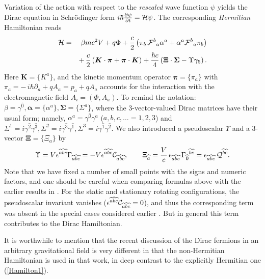 \documentclass[preprint,showpacs,preprintnumbers,eqsecnum,amsmath,amssymb]{revtex4-1}
\begin{document}
Variation of the action with respect to the
{\it rescaled} wave function $\psi$ yields the Dirac equation in Schr\"odinger
form $i\hbar\frac{\partial \psi} {\partial t}= {\cal H}\psi$. The
corresponding {\it Hermitian} Hamiltonian reads
\begin{eqnarray}
{\cal H} &=& \beta mc^2V + q\Phi + {\frac c 2}\left(\pi_b\,{\cal F}^b{}_a
\alpha^a + \alpha^a{\cal F}^b{}_a\pi_b\right)\nonumber\\
\label{Hamilton1} && +\,{\frac c2}\left(\bm{K}\cdot\bm{\pi} +
\bm{\pi}\cdot\bm{K}\right) + {\frac {\hbar c}4}\left(\bm{\Xi}\cdot\bm{\Sigma}
- \Upsilon\gamma_5 \right).
\end{eqnarray}
Here ${\bm K} = \{K^a\}$, and the kinetic momentum operator ${\bm\pi} = \{\pi_a\}$
with $\pi_a = -\,i\hbar\partial_a + qA_a = p_a + qA_a$ accounts for the interaction
with the electromagnetic field $A_i = (\Phi, A_a)$. To remind the notation: $\beta
= \gamma^{\hat 0}, {\bm\alpha} = \{\alpha^a\}, {\bm\Sigma} = \{\Sigma^a\}$, where the
3-vector-valued Dirac matrices have their usual form; namely, $\alpha^a = \gamma^{\hat 0}
\gamma^a$ ($a,b,c,\dots = 1,2,3$) and $\Sigma^1 = i\gamma^{\hat 2}\gamma^{\hat 3},
\Sigma^2 = i\gamma^{\hat 3}\gamma^{\hat 1}, \Sigma^3 = i\gamma^{\hat 1}\gamma^{\hat 2}$.
We also introduced a pseudoscalar $\Upsilon$ and a 3-vector ${\bm\Xi} = \{\Xi_a\}$ by
\begin{equation}
\Upsilon = V\epsilon^{\widehat{a}\widehat{b}\widehat{c}}\Gamma_{\widehat{a}
\widehat{b}\widehat{c}} = - V\epsilon^{\widehat{a}\widehat{b}\widehat{c}}
{\cal C}_{\widehat{a}\widehat{b}\widehat{c}},\qquad \Xi_{\widehat{a}} =
{\frac Vc}\,\epsilon_{\widehat{a}\widehat{b}\widehat{c}}\,\Gamma_{\widehat{0}}
{}^{\widehat{b}\widehat{c}} = \epsilon_{\widehat{a}\widehat{b}\widehat{c}}
\,{\cal Q}^{\widehat{b}\widehat{c}}.\label{AB}
\end{equation}
Note that we have fixed a number of small points with the signs and numeric factors,
and one should be careful when comparing formulas above with the earlier results
in \cite{ostrong}. For the static and stationary rotating configurations, the
pseudoscalar invariant vanishes ($\epsilon^{\widehat{a}\widehat{b}\widehat{c}} {\cal
C}_{\widehat{a}\widehat{b}\widehat{c}} = 0$), and thus the corresponding term was absent in
the special cases considered earlier \cite{OST,ostrong}. But in general this term
contributes to the Dirac Hamiltonian.

It is worthwhile to mention that the recent discussion \cite{GM} of the
Dirac fermions in an arbitrary gravitational field is very
different in that the non-Hermitian Hamiltonian is used in that
work, in deep contrast to the explicitly Hermitian one
(\ref{Hamilton1}).
\end{document}
